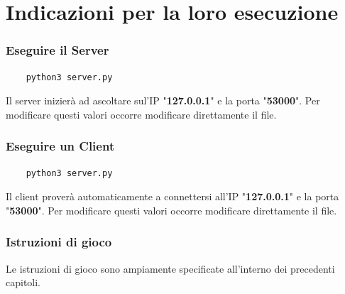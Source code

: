 \documentclass[a4paper,12pt]{report}
\begin{document}
\chapter{Indicazioni per la loro esecuzione}
\subsection{Eseguire il Server}
\begin{verbatim}
	python3 server.py
\end{verbatim}
Il server inizierà ad ascoltare sul'IP "\textbf{127.0.0.1}" e la porta "\textbf{53000}". Per modificare questi valori occorre modificare direttamente il file.
\subsection{Eseguire un Client}
\begin{verbatim}
	python3 server.py
\end{verbatim}
Il client proverà automaticamente a connettersi all'IP "\textbf{127.0.0.1}" e la porta "\textbf{53000}". Per modificare questi valori occorre modificare direttamente il file.
\subsection{Istruzioni di gioco}
Le istruzioni di gioco sono ampiamente specificate all'interno dei precedenti capitoli.
\end{document}
